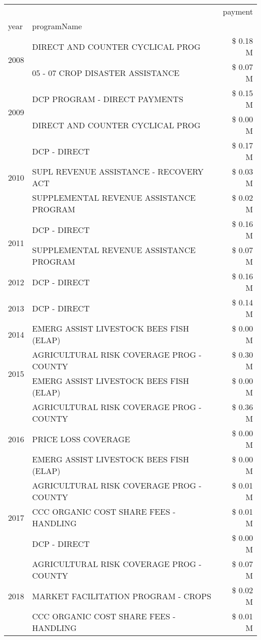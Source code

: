 \begin{tabular}{llr}
\toprule
 &  & payment \\
year & programName &  \\
\midrule
\multirow[t]{2}{*}{2008} & DIRECT AND COUNTER CYCLICAL PROG & \$ 0.18 M \\
 & 05 - 07 CROP DISASTER ASSISTANCE & \$ 0.07 M \\
\cline{1-3}
\multirow[t]{2}{*}{2009} & DCP PROGRAM - DIRECT PAYMENTS & \$ 0.15 M \\
 & DIRECT AND COUNTER CYCLICAL PROG & \$ 0.00 M \\
\cline{1-3}
\multirow[t]{3}{*}{2010} & DCP - DIRECT & \$ 0.17 M \\
 & SUPL REVENUE ASSISTANCE - RECOVERY ACT & \$ 0.03 M \\
 & SUPPLEMENTAL REVENUE ASSISTANCE PROGRAM & \$ 0.02 M \\
\cline{1-3}
\multirow[t]{2}{*}{2011} & DCP - DIRECT & \$ 0.16 M \\
 & SUPPLEMENTAL REVENUE ASSISTANCE PROGRAM & \$ 0.07 M \\
\cline{1-3}
2012 & DCP - DIRECT & \$ 0.16 M \\
\cline{1-3}
2013 & DCP - DIRECT & \$ 0.14 M \\
\cline{1-3}
2014 & EMERG ASSIST LIVESTOCK BEES FISH (ELAP) & \$ 0.00 M \\
\cline{1-3}
\multirow[t]{2}{*}{2015} & AGRICULTURAL RISK COVERAGE PROG - COUNTY & \$ 0.30 M \\
 & EMERG ASSIST LIVESTOCK BEES FISH (ELAP) & \$ 0.00 M \\
\cline{1-3}
\multirow[t]{3}{*}{2016} & AGRICULTURAL RISK COVERAGE PROG - COUNTY & \$ 0.36 M \\
 & PRICE LOSS COVERAGE & \$ 0.00 M \\
 & EMERG ASSIST LIVESTOCK BEES FISH (ELAP) & \$ 0.00 M \\
\cline{1-3}
\multirow[t]{3}{*}{2017} & AGRICULTURAL RISK COVERAGE PROG - COUNTY & \$ 0.01 M \\
 & CCC ORGANIC COST SHARE FEES - HANDLING & \$ 0.01 M \\
 & DCP - DIRECT & \$ 0.00 M \\
\cline{1-3}
\multirow[t]{3}{*}{2018} & AGRICULTURAL RISK COVERAGE PROG - COUNTY & \$ 0.07 M \\
 & MARKET FACILITATION PROGRAM - CROPS & \$ 0.02 M \\
 & CCC ORGANIC COST SHARE FEES - HANDLING & \$ 0.01 M \\
\cline{1-3}

\end{tabular}

